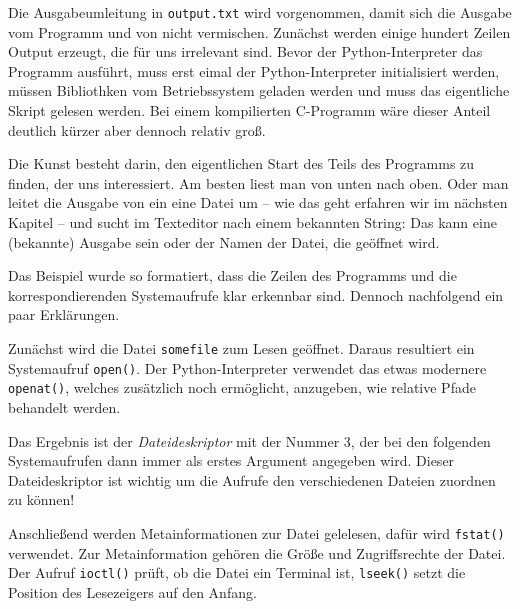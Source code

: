 Die Ausgabeumleitung in \texttt{output.txt} wird vorgenommen, damit sich die Ausgabe vom Programm
und von \strace{} nicht vermischen. Zunächst werden einige hundert Zeilen Output erzeugt, die für
uns irrelevant sind. Bevor der Python-Interpreter das Programm ausführt, muss erst eimal der
Python-Interpreter initialisiert werden, müssen Bibliothken vom Betriebssystem geladen werden und
muss das eigentliche Skript gelesen werden. Bei einem kompilierten C-Programm wäre dieser Anteil deutlich kürzer aber dennoch relativ groß.

Die Kunst besteht darin, den eigentlichen Start des Teils des Programms zu finden, der uns
interessiert. Am besten liest man von unten nach oben. Oder man leitet die Ausgabe von \strace{}
ein eine Datei um -- wie das geht erfahren wir im nächsten Kapitel -- und sucht im Texteditor nach
einem bekannten String: Das kann eine (bekannte) Ausgabe sein oder der Namen der Datei, die
geöffnet wird.

Das Beispiel wurde so formatiert, dass die Zeilen des Programms und die korrespondierenden
Systemaufrufe klar erkennbar sind. Dennoch nachfolgend ein paar Erklärungen.

Zunächst wird die Datei \texttt{somefile} zum Lesen geöffnet. Daraus resultiert ein Systemaufruf
\texttt{open()}. Der Python-Interpreter verwendet das etwas modernere \texttt{openat()}, welches
zusätzlich noch ermöglicht, anzugeben, wie relative Pfade behandelt werden.

Das Ergebnis ist der \emph{Dateideskriptor} mit der Nummer 3, der bei den folgenden Systemaufrufen
dann immer als erstes Argument angegeben wird. Dieser Dateideskriptor ist wichtig um die Aufrufe
den verschiedenen Dateien zuordnen zu können!

Anschließend werden Metainformationen zur Datei gelelesen, dafür wird \texttt{fstat()} verwendet.
Zur Metainformation gehören die Größe und Zugriffsrechte der Datei. Der Aufruf \texttt{ioctl()}
prüft, ob die Datei ein Terminal ist, \texttt{lseek()} setzt die Position des Lesezeigers auf den
Anfang.


